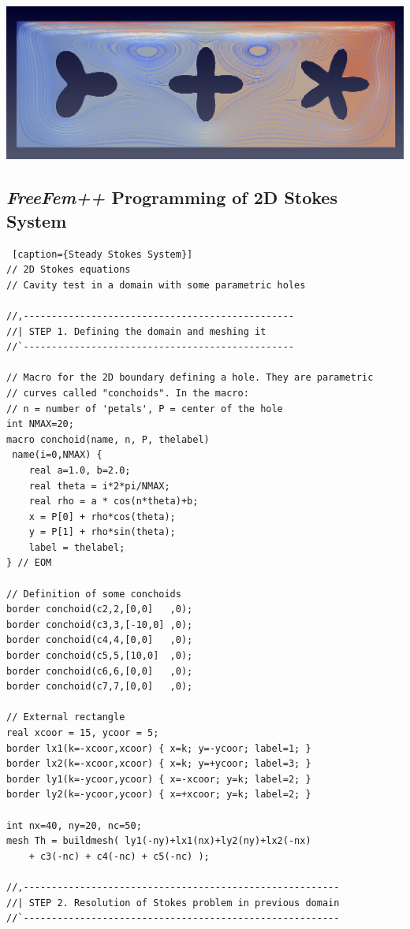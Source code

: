 \documentclass[12pt]{article}
\newcommand{\FF}{\textit{FreeFem++}\xspace}
\begin{document}
\begin{center}
  \includegraphics[width=0.66\linewidth]{stokes-conchoids}
\end{center}


\subsection{\FF Programming of 2D Stokes System}

\lstset{language=freefem++}
\begin{lstlisting} [caption={Steady Stokes System}]
// 2D Stokes equations
// Cavity test in a domain with some parametric holes

//,------------------------------------------------
//| STEP 1. Defining the domain and meshing it
//`------------------------------------------------

// Macro for the 2D boundary defining a hole. They are parametric
// curves called "conchoids". In the macro:
// n = number of 'petals', P = center of the hole
int NMAX=20;
macro conchoid(name, n, P, thelabel)
 name(i=0,NMAX) {
    real a=1.0, b=2.0;
    real theta = i*2*pi/NMAX;
    real rho = a * cos(n*theta)+b;
    x = P[0] + rho*cos(theta);
    y = P[1] + rho*sin(theta);
    label = thelabel;
} // EOM

// Definition of some conchoids
border conchoid(c2,2,[0,0]   ,0);
border conchoid(c3,3,[-10,0] ,0);
border conchoid(c4,4,[0,0]   ,0);
border conchoid(c5,5,[10,0]  ,0);
border conchoid(c6,6,[0,0]   ,0);
border conchoid(c7,7,[0,0]   ,0);

// External rectangle
real xcoor = 15, ycoor = 5;
border lx1(k=-xcoor,xcoor) { x=k; y=-ycoor; label=1; }
border lx2(k=-xcoor,xcoor) { x=k; y=+ycoor; label=3; }
border ly1(k=-ycoor,ycoor) { x=-xcoor; y=k; label=2; }
border ly2(k=-ycoor,ycoor) { x=+xcoor; y=k; label=2; }

int nx=40, ny=20, nc=50;
mesh Th = buildmesh( ly1(-ny)+lx1(nx)+ly2(ny)+lx2(-nx)
    + c3(-nc) + c4(-nc) + c5(-nc) );

//,--------------------------------------------------------
//| STEP 2. Resolution of Stokes problem in previous domain
//`--------------------------------------------------------


\end{lstlisting}
\end{document}

